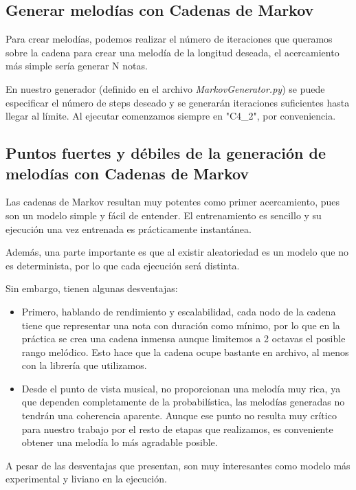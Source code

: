     \subsection{Generar melodías con Cadenas de Markov}
    \label{subsec:generarCadenasMarkov}
    Para crear melodías, podemos realizar el número de iteraciones que queramos sobre la cadena para crear una melodía de la longitud deseada, el acercamiento más simple sería generar N notas. 
    
    En nuestro generador (definido en el archivo \textit{MarkovGenerator.py}) se puede especificar el número de steps deseado y se generarán iteraciones suficientes hasta llegar al límite. Al ejecutar comenzamos siempre en "C4\_2", por conveniencia.

    \subsection{Puntos fuertes y débiles de la generación de melodías con Cadenas de Markov}
    \label{subsec:ventajasYDesventajasMarkov}
    Las cadenas de Markov resultan muy potentes como primer acercamiento, pues son un modelo simple y fácil de entender. El entrenamiento es sencillo y su ejecución una vez entrenada es prácticamente instantánea.

    Además, una parte importante es que al existir aleatoriedad es un modelo que no es determinista, por lo que cada ejecución será distinta.

    Sin embargo, tienen algunas desventajas:
    \begin{itemize}
        \item Primero, hablando de rendimiento y escalabilidad, cada nodo de la cadena tiene que representar una nota con duración como mínimo, por lo que en la práctica se crea una cadena inmensa aunque limitemos a 2 octavas el posible rango melódico. Esto hace que la cadena ocupe bastante en archivo, al menos con la librería que utilizamos.
        \item Desde el punto de vista musical, no proporcionan una melodía muy rica, ya que dependen completamente de la probabilística, las melodías generadas no tendrán una coherencia aparente. Aunque ese punto no resulta muy crítico para nuestro trabajo por el resto de etapas que realizamos, es conveniente obtener una melodía lo más agradable posible.
    \end{itemize}
    
    A pesar de las desventajas que presentan, son muy interesantes como modelo más experimental y liviano en la ejecución.

